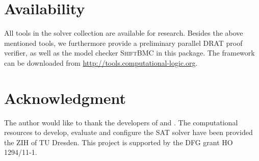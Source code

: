 \documentclass[conference]{IEEEtran}
\begin{document}
\section{Availability}

All tools in the solver collection are available for research. 
Besides the above mentioned tools, we furthermore provide a preliminary parallel DRAT proof verifier, as well as the model checker \textsc{ShiftBMC} in this package.
The framework can be downloaded from \url{http://tools.computational-logic.org}.

\section*{Acknowledgment}
The author would like to thank the developers of \glucose and \minisat. 
The computational resources to develop, evaluate and configure the SAT solver have been provided the ZIH of TU Dresden. 
This project is supported by the DFG grant HO 1294/11-1. 

% 


\end{document}
